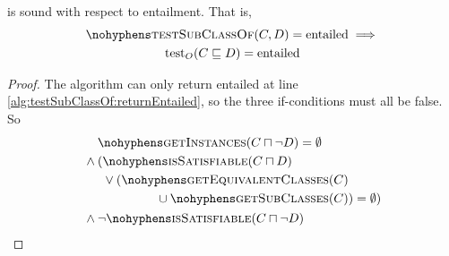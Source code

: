 \documentclass[paper.tex]{subfiles}
\begin{document}
\begin{lemma}
  \label{lem:testSubClassOfEntailedSound}
   is sound with respect to entailment.  That is,
  \begin{multline*}
    \textproc{testSubClassOf}(C, D) = \mathrm{entailed} \implies \\
    \test_O(C \sqsubseteq D) = \mathrm{entailed}
  \end{multline*}
\end{lemma}
\begin{proof}
  The algorithm can only return entailed at line \ref{alg:testSubClassOf:returnEntailed}, so the three if-conditions must all be false.  So
  \begin{equation}
    \label{eqn:testSubClassOfEntailed}
    \begin{aligned}[b]
      & \textproc{getInstances}(C \sqcap \neg D) = \emptyset \\
      {}\land{}& \begin{aligned}[t]
        (& \textproc{isSatisfiable}(C \sqcap D) \\
        & \lor \begin{aligned}[t]
          (\textproc{getEquivalentClasses}(C)& \\
          {} \union \textproc{getSubClasses}(C)&) = \emptyset)
        \end{aligned}
      \end{aligned} \\
      {}\land{}& \lnot \textproc{isSatisfiable}(C \sqcap \neg D)
    \end{aligned}
  \end{equation}



\end{proof}
\end{document}
